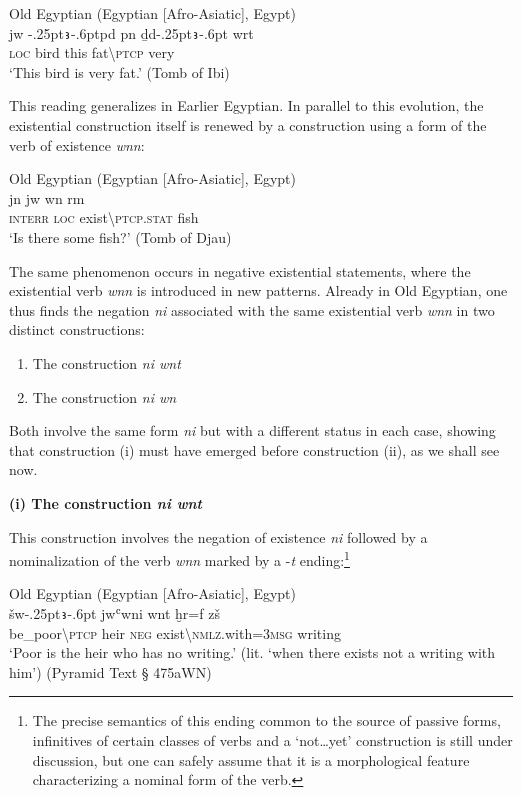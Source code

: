\documentclass[output=paper]{langsci/langscibook}
\newcommand{\ꜥ}{ʿ}
\newcommand{\ꜣ}{\kern-.25pt\texttt{ꜣ}\kern-.6pt}
\begin{document}
\ea Old Egyptian (Egyptian [Afro-Asiatic], Egypt) \label{ex:AE19}\\
	\gll jw {\ꜣ}pd pn ḏd{\ꜣ} wrt\\
	\textsc{loc} bird this fat\textbackslash\textsc{ptcp} very\\
	\glt ‘This bird is very fat.’ (Tomb of Ibi)
\z 

This reading generalizes in Earlier Egyptian. In parallel to this evolution, the existential construction itself is renewed by a construction using a form of the verb of existence \textit{wnn}:

\ea Old Egyptian (Egyptian [Afro-Asiatic], Egypt) \label{ex:AE20}\\
	\gll jn jw wn rm\\ 
	\textsc{interr} \textsc{loc} exist\textbackslash\textsc{ptcp.stat} fish\\
	\glt ‘Is there some fish?’ (Tomb of Djau)
\z 

The same phenomenon occurs in negative existential statements, where the existential verb \textit{wnn} is introduced in new patterns. Already in Old Egyptian, one thus finds the negation \textit{ni} associated with the same existential verb \textit{wnn} in two distinct constructions: 
\begin{enumerate}
    \item The construction \textit{ni wnt} 
    \item The construction \textit{ni wn}
\end{enumerate}
 
Both involve the same form \textit{ni} but with a different status in each case, showing that construction (i) must have emerged before construction (ii), as we shall see now.  

\medskip
\noindent
\textbf{(i) The construction \textit{ni wnt}} 

This construction involves the negation of existence \textit{ni} followed by a nominalization of the verb \textit{wnn} marked by a -\textit{t} ending:\footnote{The precise semantics of this ending common to the source of passive forms, infinitives of certain classes of verbs and a ‘not…yet’ construction is still under discussion, but one can safely assume that it is a morphological feature characterizing a nominal form of the verb.}

\ea Old Egyptian (Egyptian [Afro-Asiatic], Egypt) \label{ex:AE21}\\
    \gll šw{\ꜣ} jw{\ꜥ}wni wnt ḫr=f zš\\
    be\_poor\textbackslash\textsc{ptcp} heir \textsc{neg} exist\textbackslash\textsc{nmlz}.with=\textsc{3msg} writing \\
    \glt ‘Poor is the heir who has no writing.’ (lit. ‘when there exists not a writing with him’) (Pyramid Text § 475aWN) 
\z 
\end{document}
